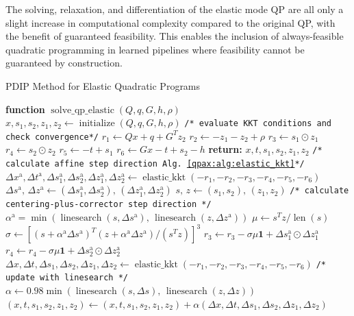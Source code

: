     The solving, relaxation, and differentiation of the elastic mode QP are all only a slight increase in computational complexity compared to the original QP, with the benefit of guaranteed feasibility. This enables the inclusion of always-feasible quadratic programming in learned pipelines where feasibility cannot be guaranteed by construction.
%
%
\begin{algorithm}
\caption{PDIP Method for Elastic Quadratic Programs}\label{qpax:alg:elastic_pdip}
\begin{algorithmic}[1]
\State \textbf{function} $\operatorname{solve\_qp\_elastic}(Q,q, G,h, \rho)$ %
\State $x, s_1, s_2, z_1, z_2 \gets \operatorname{initialize}(Q,q, G,h, \rho)$ \Comment{\ref{qpax:sec:elastic_init}}
\State \texttt{/* evaluate KKT conditions and check convergence*/}
\State $r_1 \gets Qx + q  + G^Tz_2$ %
\State $r_2 \gets -z_1 - z_2 + \rho$
\State $r_3 \gets s_1 \odot z_1$
\State $r_4 \gets s_2 \odot z_2$
\State $r_5 \gets -t + s_1 $
\State $r_6 \gets Gx - t + s_2 - h$
\State \textbf{return:} $x, t, s_1, s_2, z_1, z_2$
\EndIf
\State
\State \texttt{/* calculate affine step direction Alg. \eqref{qpax:alg:elastic_kkt}*/}
\State $\Delta x^\text{a}, \Delta t^\text{a}, \Delta s_1^\text{a}, \Delta s_2^\text{a}, \Delta z_1^\text{a}, \Delta z_2^\text{a}\gets \operatorname{elastic\_kkt}(-r_1, -r_2, -r_3, -r_4, -r_5, -r_6)$
\State $\Delta s^\text{a},\, \Delta z^\text{a} \gets (\Delta s_1^\text{a}, \Delta s_2^\text{a}), \,(\Delta z_1^\text{a}, \Delta z_2^\text{a})$
\State $s,\, z \gets (s_1,s_2), \, (z_1, z_2)$
\State \texttt{/* calculate centering-plus-corrector step direction */}
\State $\alpha^\text{a} = \min( \operatorname{linesearch}(s, \Delta s^\text{a}),\, \operatorname{linesearch}(z, \Delta z^\text{a}) )$ \Comment{\eqref{qpax:sec:background:linesearch}}
\State $\mu \gets s^Tz/\operatorname{len}(s)$
\State $\sigma \gets [(s + \alpha^\text{a} \Delta s^\text{a})^T(z + \alpha^\text{a}\Delta z^\text{a})/(s^Tz)]^3$
\State $r_3 \gets r_3 - \sigma \mu \mathbf{1} + \Delta s_1^\text{a} \odot \Delta z_1^\text{a}$
\State $r_4 \gets r_4 - \sigma \mu \mathbf{1} + \Delta s_2^\text{a} \odot \Delta z_2^\text{a}$
\State $\Delta x, \Delta t, \Delta s_1, \Delta s_2, \Delta z_1, \Delta z_2 \gets \operatorname{elastic\_kkt}(-r_1, -r_2, -r_3, -r_4, -r_5, -r_6)$
\State
\State \texttt{/* update with linesearch */}
\State $\alpha \gets 0.98 \min(\operatorname{linesearch}(s, \Delta s),\, \operatorname{linesearch}(z, \Delta z))$
\State $(x, t, s_1, s_2, z_1, z_2) \gets (x, t, s_1, s_2, z_1, z_2)  + \alpha(\Delta x, \Delta t, \Delta s_1, \Delta s_2,  \Delta z_1, \Delta z_2)$
\EndFor
\end{algorithmic}
\end{algorithm}
